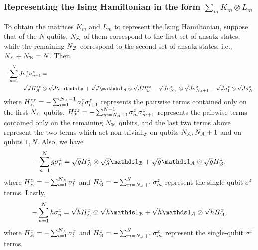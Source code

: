 \subsubsection{Representing the Ising Hamiltonian in the form $\sum_m K_m \otimes L_m$}  

To obtain the matrices $K_m$ and $L_m$ to represent the Ising Hamiltonian, suppose that of the $N$ qubits, $N_{\mathcal{A}}$ of them correspond to the first set of ansatz states, while the remaining $N_{\mathcal{B}}$ correspond to the second set of ansatz states, i.e., $N_{\mathcal{A}} + N_{\mathcal{B}} = N$.
Then 
\begin{equation}
    \begin{aligned}
        -\sum_{n=1}^N J &\sigma_n^z \sigma_{n+1}^z = \\
        & \sqrt{J} H_\A^{zz} \otimes \sqrt{J} \id_\B +
        \sqrt{J} \id_\A \otimes \sqrt{J} H_\B^{zz} - 
        \sqrt{J} \sigma_{N_\A}^z \otimes \sqrt{J} \sigma_{{N_\A}+1}^z - 
        \sqrt{J} \sigma_1^z \otimes \sqrt{J} \sigma_N^z,
    \end{aligned}
\end{equation}
where
        $H_{\mathcal{A}}^{zz} = -\sum_{l=1}^{{N_{\mathcal{A}}}-1} \sigma_l^z \sigma_{l+1}^z$ represents the pairwise terms contained only on the first $N_{\mathcal{A}}$ qubits, 
        $H_{\mathcal{B}}^{zz} = -\sum_{m={N_{\mathcal{A}}}+1}^{N-1} \sigma_m^z \sigma_{m+1}^z$ represents the pairwise terms contained only on the remaining $N_{\mathcal{B}}$ qubits, and the last two terms above represent the two terms which act non-trivially on qubits $N_{\mathcal{A}}, N_{\mathcal{A}} +1$ and on qubits $1, N$.   
Also, we have 
\begin{equation}
    \begin{aligned}
        -\sum_{n=1}^N g \sigma_n^z = \sqrt{g} H_\A^z \otimes \sqrt{g} \id_\B + 
        \sqrt{g} \id_\A \otimes \sqrt{g} H_\B^z,
    \end{aligned}
\end{equation}
where
        $H_{\mathcal{A}}^z = -\sum_{l=1}^{N_{\mathcal{A}}} \sigma_l^z$ and 
        $H_{\mathcal{B}}^z = -\sum_{m=N_{\mathcal{A}}+1}^N \sigma_m^z$ represent the single-qubit $\sigma^z$ terms. 
Lastly,
\begin{equation}
    \begin{aligned}
        -\sum_{n=1}^N h \sigma_n^x = \sqrt{h} H_\A^x \otimes \sqrt{h} \id_\B + 
    \sqrt{h} \id_\A \otimes \sqrt{h} H_\B^x,    
    \end{aligned}
\end{equation}
where
        $H_{\mathcal{A}}^x = -\sum_{l=1}^{N_{\mathcal{A}}} \sigma_l^x$ and 
        $H_{\mathcal{B}}^x = -\sum_{m={N_{\mathcal{A}}}+1}^N \sigma_m^x$ represent the single-qubit $\sigma^x$ terms. 

